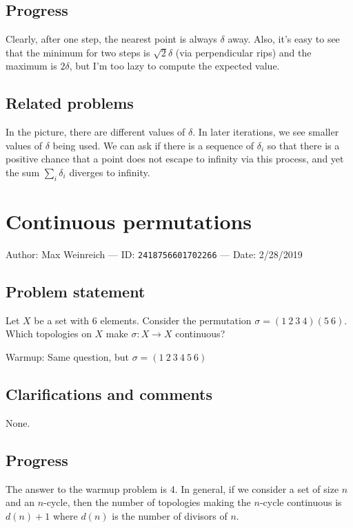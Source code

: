 \documentclass[10pt]{article}
\begin{document}
\subsection{Progress}

Clearly, after one step, the nearest point is always $\delta$ away. Also, it's easy to see that the minimum for two steps is $\sqrt2\delta$ (via perpendicular rips) and the maximum is $2\delta$, but I'm too lazy to compute the expected value.

\subsection{Related problems}

In the picture, there are different values of $\delta$. In later iterations, we see smaller values of $\delta$ being used. We can ask if there is a sequence of $\delta_i$ so that there is a positive chance that a point does not escape to infinity via this process, and yet the sum $\sum_i\delta_i$ diverges to infinity.

\pagebreak

\section{Continuous permutations}

Author: Max Weinreich --- ID: \verb`2418756601702266` --- Date: 2/28/2019

\subsection{Problem statement}

Let $X$ be a set with 6 elements. Consider the permutation $\sigma=(1\ 2\ 3\ 4)(5\ 6)$. Which topologies on $X$ make $\sigma:X\to X$ continuous?

Warmup: Same question, but $\sigma=(1\ 2\ 3\ 4\ 5\ 6)$

\subsection{Clarifications and comments}

None.

\subsection{Progress}

The answer to the warmup problem is 4. In general, if we consider a set of size $n$ and an $n$-cycle, then the number of topologies making the $n$-cycle continuous is $d(n)+1$ where $d(n)$ is the number of divisors of $n$.
\end{document}

